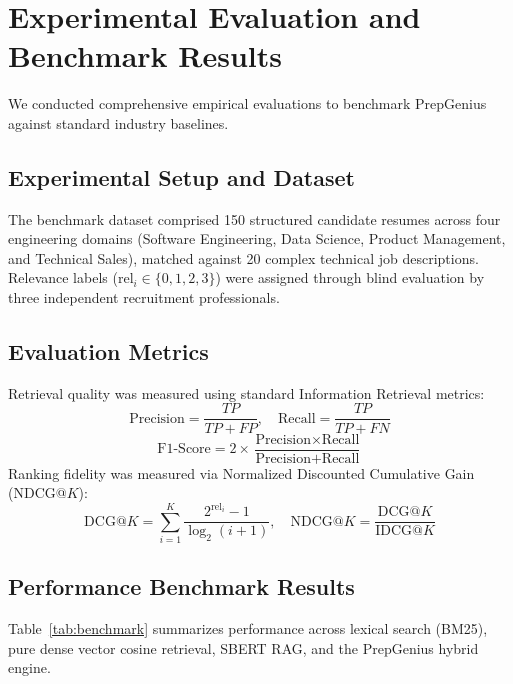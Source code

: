\documentclass[conference]{IEEEtran}
\begin{document}
\section{Experimental Evaluation and Benchmark Results}
We conducted comprehensive empirical evaluations to benchmark PrepGenius against standard industry baselines.

\subsection{Experimental Setup and Dataset}
The benchmark dataset comprised 150 structured candidate resumes across four engineering domains (Software Engineering, Data Science, Product Management, and Technical Sales), matched against 20 complex technical job descriptions. Relevance labels ($\text{rel}_i \in \{0, 1, 2, 3\}$) were assigned through blind evaluation by three independent recruitment professionals.

\subsection{Evaluation Metrics}
Retrieval quality was measured using standard Information Retrieval metrics:
\begin{equation}
\text{Precision} = \frac{TP}{TP + FP}, \quad \text{Recall} = \frac{TP}{TP + FN}
\end{equation}
\begin{equation}
\text{F1-Score} = 2 \times \frac{\text{Precision} \times \text{Recall}}{\text{Precision} + \text{Recall}}
\end{equation}
Ranking fidelity was measured via Normalized Discounted Cumulative Gain (NDCG@$K$):
\begin{equation}
\text{DCG}@K = \sum_{i=1}^{K} \frac{2^{\text{rel}_i} - 1}{\log_2(i + 1)}, \quad \text{NDCG}@K = \frac{\text{DCG}@K}{\text{IDCG}@K}
\end{equation}

\subsection{Performance Benchmark Results}
Table~\ref{tab:benchmark} summarizes performance across lexical search (BM25), pure dense vector cosine retrieval, SBERT RAG, and the PrepGenius hybrid engine.
\end{document}
